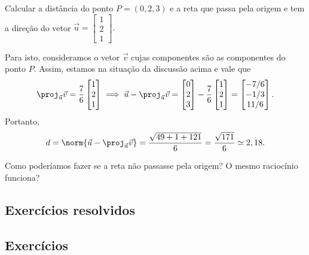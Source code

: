 \begin{ex}
	Calcular a distância do ponto $P = (0,2,3)$ e a reta que passa pela origem e tem a direção do vetor $\vec{u} =
	\begin{bmatrix}
	1 \\ 2 \\1
	\end{bmatrix}.$

	Para isto, consideramos o vetor $\vec{v}$ cujas componentes são as componentes do ponto $P$. Assim, estamos na situação da discussão acima e vale que
	\begin{equation}
	\proj_{\vec{u}} \vec{v} = \frac{7}{6}
	\begin{bmatrix}
	1 \\ 2 \\1
	\end{bmatrix} \implies
	\vec{u} - \proj_{\vec{u}} \vec{v} =
	\begin{bmatrix}
	0 \\ 2 \\ 3
	\end{bmatrix} - \frac{7}{6}
	\begin{bmatrix}
	1 \\ 2 \\1
	\end{bmatrix} =
	\begin{bmatrix}
	-7/6 \\ -1/3 \\ 11/6
	\end{bmatrix}.
	\end{equation} Portanto,
	\begin{equation}
	d = \norm{\vec{u} - \proj_{\vec{u}} \vec{v}} = \frac{\sqrt{49 + 1 + 121}}{6} = \frac{\sqrt{171}}{6} \simeq 2,18.
	\end{equation}
\end{ex}

\begin{exer}
	Como poderíamos fazer se a reta não passasse pela origem? O mesmo raciocínio funciona?
\end{exer}

\subsection*{Exercícios resolvidos}

\construirExeresol

\subsection*{Exercícios}

